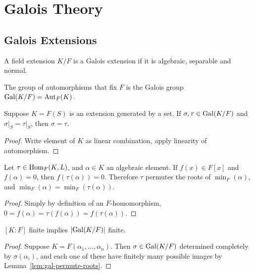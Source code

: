 \chapter{Galois Theory}\label{sec:galois}

\section{Galois Extensions}

\begin{definition}
    A field extension \(K/F\) is a Galois extension
    if it is algebraic, separable and normal.
\end{definition}
\begin{definition}
    The group of automorphisms that fix \(F\)
    is the Galois group \(\operatorname{Gal}(K/F) = \operatorname{Aut}_F(K)\).
\end{definition}

\begin{lemma}
    Suppose \(K = F(S)\) is an extension generated by a set.
    If \(\sigma,\tau \in \operatorname{Gal}(K/F)\) and \(\sigma\vert_S = \tau\vert_S\),
    then \(\sigma  = \tau\).
\end{lemma}
\begin{proof}
    Write element of \(K\) as linear combination,
    apply linearity of automorphism.
\end{proof}
\begin{lemma}\label{lem:gal-permute-roots}
    Let \(\tau \in \operatorname{Hom}_F(K,L)\), and \(\alpha \in K\) an algebraic element.
    If \(f(x) \in F[x]\) and \(f(\alpha) = 0\),
    then \(f(\tau(\alpha)) = 0\).
    Therefore \(\tau\) permutes the roots of \(\min_F(\alpha)\),
    and \(\min_F(\alpha) = \min_F(\tau(\alpha))\).
\end{lemma}
\begin{proof}
    Simply by definition of an \(F\)-homomorphism,
    \(0 = f(\alpha) = \tau(f(\alpha)) = f(\tau(\alpha))\).
\end{proof}
\begin{corollary}
    \([K:F]\) finite implies \(\abs{\operatorname{Gal}(K/F)}\) finite.
\end{corollary}
\begin{proof}
    Suppose \(K = F(\alpha_1,\hdots,\alpha_n)\).
    Then \(\sigma \in \operatorname{Gal}(K/F)\) determined completely by \(\sigma(\alpha_i)\),
    and each one of these have finitely many possible images
    by Lemma~\ref{lem:gal-permute-roots}.
\end{proof}

